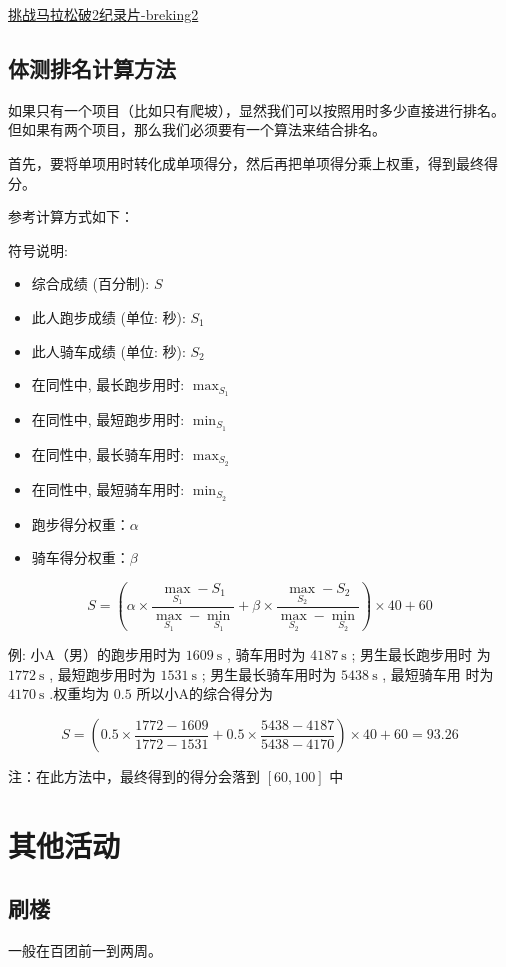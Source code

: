 \documentclass{ctexbook}
\begin{document}
\href{https://www.bilibili.com/video/BV1pb411K74L}{挑战马拉松破2纪录片-breking2}
\subsection{体测排名计算方法}
如果只有一个项目（比如只有爬坡），显然我们可以按照用时多少直接进行排名。但如果有两个项目，那么我们必须要有一个算法来结合排名。

首先，要将单项用时转化成单项得分，然后再把单项得分乘上权重，得到最终得分。

参考计算方式如下：

符号说明:

\begin{itemize}
    \item 综合成绩 (百分制):  $S$ 
    \item 此人跑步成绩 (单位: 秒):  $S_{1}$ 
    \item 此人骑车成绩 (单位: 秒):  $S_{2}$ 
    \item 在同性中, 最长跑步用时:  $\max _{S_{1}}$ 
    \item 在同性中, 最短跑步用时:  $\min _{S_{1}}$ 
    \item 在同性中, 最长骑车用时:  $\max _{S_{2}}$ 
    \item 在同性中, 最短骑车用时:  $\min _{S_{2}}$ 
    \item 跑步得分权重：$\alpha$
    \item 骑车得分权重：$\beta$
\end{itemize}

\[S=\left(\alpha \times \frac{\max _{S_{1}}-S_{1}}{\max _{S_{1}}-\min _{S_{1}}}+\beta\times \frac{\max _{S_{2}}-S_{2}}{\max _{S_{2}}-\min _{S_{2}}}\right) \times 40+60\]

例: 小A（男）的跑步用时为  $1609 \mathrm{~s}$ , 骑车用时为  4$187 \mathrm{~s}$ ; 男生最长跑步用时 为  $1772 \mathrm{~s}$ , 最短跑步用时为  $1531 \mathrm{~s}$ ; 男生最长骑车用时为  $5438 \mathrm{~s}$ , 最短骑车用 时为  $4170 \mathrm{~s}$ .权重均为 $0.5$ 所以小A的综合得分为

\[S=\left(0.5 \times \frac{1772-1609}{1772-1531}+0.5 \times \frac{5438-4187}{5438-4170}\right) \times 40+60=93.26\]

注：在此方法中，最终得到的得分会落到 $[60,100]$ 中

\section{其他活动}
\subsection{刷楼}
一般在百团前一到两周。
\end{document}
